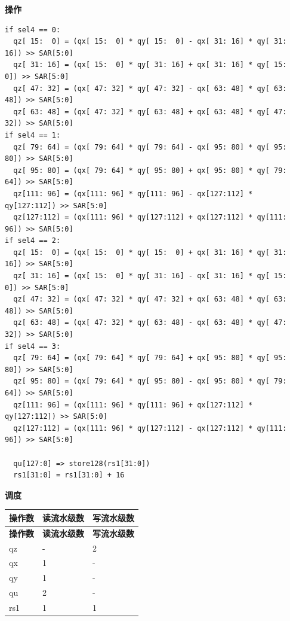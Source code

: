 \textbf{操作}\\
\begin{lstlisting}
if sel4 == 0:
  qz[ 15:  0] = (qx[ 15:  0] * qy[ 15:  0] - qx[ 31: 16] * qy[ 31: 16]) >> SAR[5:0]
  qz[ 31: 16] = (qx[ 15:  0] * qy[ 31: 16] + qx[ 31: 16] * qy[ 15:  0]) >> SAR[5:0]
  qz[ 47: 32] = (qx[ 47: 32] * qy[ 47: 32] - qx[ 63: 48] * qy[ 63: 48]) >> SAR[5:0]
  qz[ 63: 48] = (qx[ 47: 32] * qy[ 63: 48] + qx[ 63: 48] * qy[ 47: 32]) >> SAR[5:0]
if sel4 == 1:
  qz[ 79: 64] = (qx[ 79: 64] * qy[ 79: 64] - qx[ 95: 80] * qy[ 95: 80]) >> SAR[5:0]
  qz[ 95: 80] = (qx[ 79: 64] * qy[ 95: 80] + qx[ 95: 80] * qy[ 79: 64]) >> SAR[5:0]
  qz[111: 96] = (qx[111: 96] * qy[111: 96] - qx[127:112] * qy[127:112]) >> SAR[5:0]
  qz[127:112] = (qx[111: 96] * qy[127:112] + qx[127:112] * qy[111: 96]) >> SAR[5:0]
if sel4 == 2:
  qz[ 15:  0] = (qx[ 15:  0] * qy[ 15:  0] + qx[ 31: 16] * qy[ 31: 16]) >> SAR[5:0]
  qz[ 31: 16] = (qx[ 15:  0] * qy[ 31: 16] - qx[ 31: 16] * qy[ 15:  0]) >> SAR[5:0]
  qz[ 47: 32] = (qx[ 47: 32] * qy[ 47: 32] + qx[ 63: 48] * qy[ 63: 48]) >> SAR[5:0]
  qz[ 63: 48] = (qx[ 47: 32] * qy[ 63: 48] - qx[ 63: 48] * qy[ 47: 32]) >> SAR[5:0]
if sel4 == 3:
  qz[ 79: 64] = (qx[ 79: 64] * qy[ 79: 64] + qx[ 95: 80] * qy[ 95: 80]) >> SAR[5:0]
  qz[ 95: 80] = (qx[ 79: 64] * qy[ 95: 80] - qx[ 95: 80] * qy[ 79: 64]) >> SAR[5:0]
  qz[111: 96] = (qx[111: 96] * qy[111: 96] + qx[127:112] * qy[127:112]) >> SAR[5:0]
  qz[127:112] = (qx[111: 96] * qy[127:112] - qx[127:112] * qy[111: 96]) >> SAR[5:0]

  qu[127:0] => store128(rs1[31:0])
  rs1[31:0] = rs1[31:0] + 16
\end{lstlisting}

\textbf{调度}\\
\begin{longtable}[c]{|l|l|l|}
    \hline
    \rowcolor{lightgray}
    \textbf{操作数} & \textbf{读流水级数} & \textbf{写流水级数} \\\hline
    \endfirsthead
    \hline
    \rowcolor{lightgray}
     \textbf{操作数} & \textbf{读流水级数} & \textbf{写流水级数} \\\hline
    \endhead
    \hline
    \endfoot


    qz & - & 2 \\\hline
     qx & 1 & - \\\hline
     qy & 1 & - \\\hline
     qu & 2 & - \\\hline
     rs1 & 1 & 1

\end{longtable}

